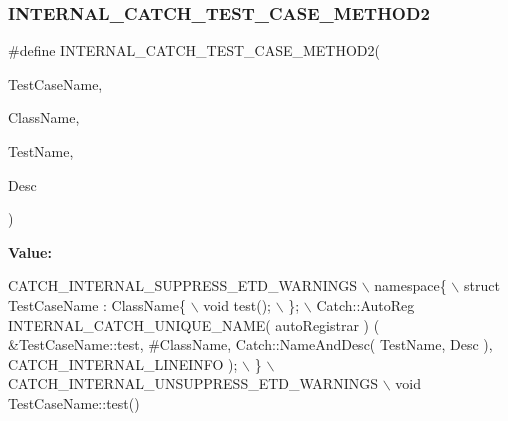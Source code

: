 \mbox{\label{catch_8hpp_a72097450f11ad05c90a0e1a77ef96e05}} 
\subsubsection{I\+N\+T\+E\+R\+N\+A\+L\+\_\+\+C\+A\+T\+C\+H\+\_\+\+T\+E\+S\+T\+\_\+\+C\+A\+S\+E\+\_\+\+M\+E\+T\+H\+O\+D2}
{\footnotesize\ttfamily \#define I\+N\+T\+E\+R\+N\+A\+L\+\_\+\+C\+A\+T\+C\+H\+\_\+\+T\+E\+S\+T\+\_\+\+C\+A\+S\+E\+\_\+\+M\+E\+T\+H\+O\+D2(\begin{DoxyParamCaption}\item[{}]{Test\+Case\+Name,  }\item[{}]{Class\+Name,  }\item[{}]{Test\+Name,  }\item[{}]{Desc }\end{DoxyParamCaption})}

{\bfseries Value\+:}
\begin{DoxyCode}
CATCH\_INTERNAL\_SUPPRESS\_ETD\_WARNINGS \(\backslash\)
        namespace\{ \(\backslash\)
            struct TestCaseName : ClassName\{ \(\backslash\)
                void test(); \(\backslash\)
            \}; \(\backslash\)
            Catch::AutoReg INTERNAL_CATCH_UNIQUE_NAME( autoRegistrar ) ( &TestCaseName::test, #ClassName, 
      Catch::NameAndDesc( TestName, Desc ), CATCH_INTERNAL_LINEINFO ); \(\backslash\)
        \} \(\backslash\)
        CATCH\_INTERNAL\_UNSUPPRESS\_ETD\_WARNINGS \(\backslash\)
        void TestCaseName::test()
\end{DoxyCode}
\mbox{\label{catch_8hpp_a1cb98d355207a372c71f19ea989eb0cc}} 

